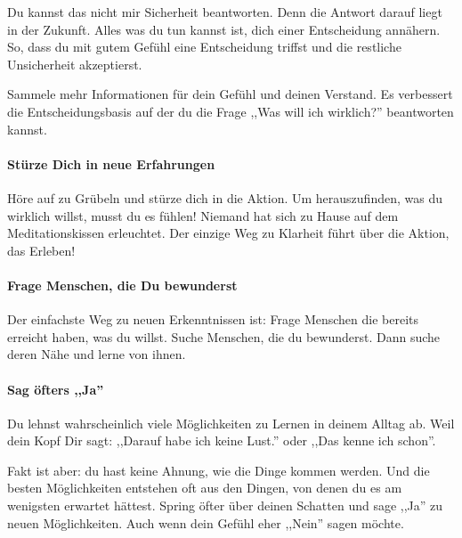 \documentclass[../Lebensziel.tex]{subfiles}
\begin{document}
Du kannst das nicht mir Sicherheit beantworten. Denn die Antwort darauf liegt in der Zukunft.
Alles was du tun kannst ist, dich einer Entscheidung annähern. So, dass du mit gutem Gefühl eine Entscheidung triffst und die restliche Unsicherheit akzeptierst.

Sammele mehr Informationen für dein Gefühl und deinen Verstand. Es verbessert die Entscheidungsbasis auf der du die Frage ,,Was will ich wirklich?'' beantworten kannst.

\paragraph{Stürze Dich in neue Erfahrungen}
Höre auf zu Grübeln und stürze dich in die Aktion. Um herauszufinden, was du wirklich willst, musst du es fühlen! Niemand hat sich zu Hause auf dem Meditationskissen erleuchtet.
Der einzige Weg zu Klarheit führt über die Aktion, das Erleben!

\paragraph{Frage Menschen, die Du bewunderst}
Der einfachste Weg zu neuen Erkenntnissen ist: Frage Menschen die bereits erreicht haben, was du willst. 
Suche Menschen, die du bewunderst. Dann suche deren Nähe und lerne von ihnen.

\paragraph{Sag öfters ,,Ja''}
Du lehnst wahrscheinlich viele Möglichkeiten zu Lernen in deinem Alltag ab. Weil dein Kopf Dir sagt: ,,Darauf habe ich keine Lust.'' oder ,,Das kenne ich schon''.

Fakt ist aber: du hast keine Ahnung, wie die Dinge kommen werden. Und die besten Möglichkeiten entstehen oft aus den Dingen, von denen du es am wenigsten erwartet hättest.
Spring öfter über deinen Schatten und sage ,,Ja'' zu neuen Möglichkeiten. Auch wenn dein Gefühl eher ,,Nein'' sagen möchte.
\end{document}
